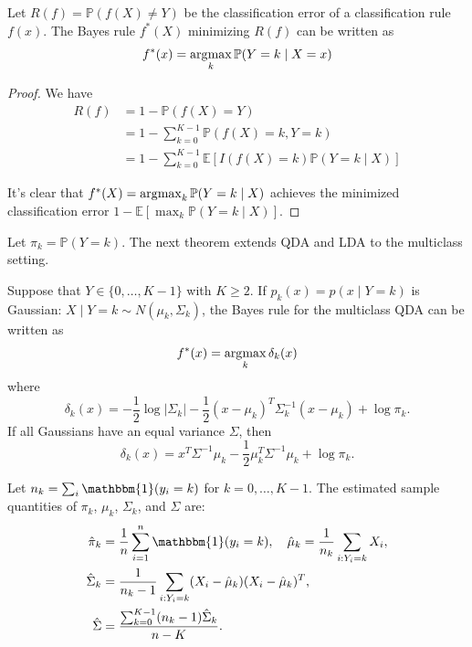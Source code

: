   \begin{theorem}
    Let $R(f) = \mathbb{P}(f(X) \neq Y)$ be the classification error of a classification rule $f(x)$. The Bayes rule $f^{\ast}(X)$ minimizing $R(f)$ can be written as
    \begin{equation}
      f^{\ast}(x) = \operatorname*{\arg\!\max}_k \mathbb{P}(Y = k \mid X = x)
    \end{equation}
  \end{theorem}
  \begin{proof}
    We have
    \begin{align}
      R(f) &= 1 - \mathbb{P}(f(X) = Y) \\
      &= 1 - \sum_{k=0}^{K-1} \mathbb{P}(f(X) = k, Y = k) \\
      &= 1 - \sum_{k=0}^{K-1} \mathbb{E}\left[I(f(X) = k)\mathbb{P}(Y = k \mid X)\right]
    \end{align}
    
    It's clear that $f^{\ast}(X) = \operatorname*{\arg\!\max}_k \mathbb{P}(Y = k \mid X)$ achieves the minimized classification error $1 - \mathbb{E}[\max_k \mathbb{P}(Y = k \mid X)]$.
  \end{proof}

  Let $\pi_k = \mathbb{P}(Y = k)$. The next theorem extends QDA and LDA to the multiclass setting.

  \begin{theorem}
    Suppose that $Y \in \{0, \ldots, K - 1\}$ with $K \geq 2$. If $p_k(x) = p(x \mid Y = k)$ is Gaussian: $X \mid Y = k \sim N(\mu_k, \Sigma_k)$, the Bayes rule for the multiclass QDA can be written as
    \begin{equation}
      f^{\ast}(x) = \operatorname*{\arg\!\max}_k \delta_k(x)
    \end{equation}
    where
    \begin{equation}
      \delta_k(x) = -\frac{1}{2}\log|\Sigma_k| - \frac{1}{2}(x - \mu_k)^T\Sigma_k^{-1}(x - \mu_k) + \log\pi_k.
    \end{equation}
    If all Gaussians have an equal variance $\Sigma$, then
    \begin{equation}
      \delta_k(x) = x^T\Sigma^{-1}\mu_k - \frac{1}{2}\mu_k^T\Sigma^{-1}\mu_k + \log\pi_k.
    \end{equation}
  \end{theorem}

  Let $n_k = \sum_i \mathbbm{1}(y_i = k)$ for $k = 0, \ldots, K - 1$. The estimated sample quantities of $\pi_k$, $\mu_k$, $\Sigma_k$, and $\Sigma$ are:
  \begin{align}
    \hat{\pi}_k &= \frac{1}{n}\sum_{i=1}^n \mathbbm{1}(y_i = k), \quad \hat{\mu}_k = \frac{1}{n_k}\sum_{i: Y_i = k} X_i, \\
    \hat{\Sigma}_k &= \frac{1}{n_k - 1}\sum_{i: Y_i = k} (X_i - \hat{\mu}_k)(X_i - \hat{\mu}_k)^T, \\
    \hat{\Sigma} &= \frac{\sum_{k=0}^{K-1}(n_k - 1)\hat{\Sigma}_k}{n - K}.
  \end{align}


